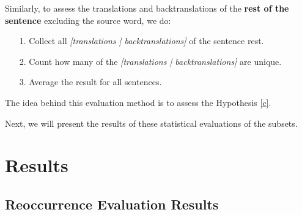 Similarly, to assess the translations and backtranslations of the \textbf{rest of the sentence} excluding the source word, we do:
\begin{enumerate}
    \item[1. ] Collect all \textit{[translations | backtranslations]} of the sentence rest.
    \item[2. ] Count how many of the \textit{[translations | backtranslations]} are unique.
    \item[3. ] Average the result for all sentences.
\end{enumerate}

The idea behind this evaluation method is to assess the Hypothesis \ref{c}.

Next, we will present the results of these statistical evaluations of the subsets.

\section{Results}
\label{ch:Base_Experiment:Results}






\subsection{Reoccurrence Evaluation Results}
\label{ch:Base_Experiment:Results:Reoccurrence}


